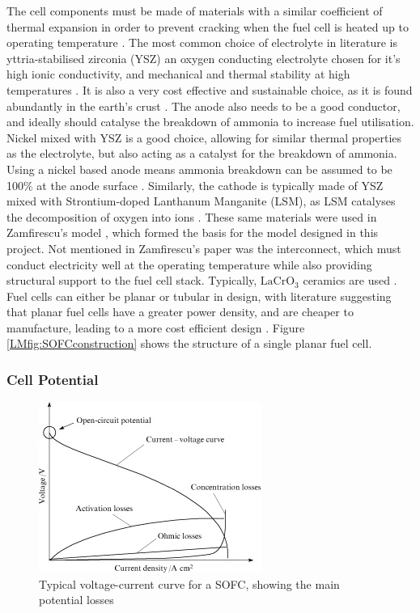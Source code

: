 \documentclass{article}
\begin{document}
    
    The cell components must be made of materials with a similar coefficient of thermal expansion in order to prevent cracking when the fuel cell is heated up to operating temperature \cite{LM2}. The most common choice of electrolyte in literature is yttria-stabilised zirconia (YSZ) \text{-} an oxygen conducting electrolyte \text{-} chosen for it's high ionic conductivity, and mechanical and thermal stability at high temperatures \cite{PR7}. It is also a very cost effective and sustainable choice, as it is found abundantly in the earth's crust \cite{LM10}. The anode also needs to be a good conductor, and ideally should catalyse the breakdown of ammonia to increase fuel utilisation. Nickel mixed with YSZ is a good choice, allowing for similar thermal properties as the electrolyte, but also acting as a catalyst for the breakdown of ammonia. Using a nickel based anode means ammonia breakdown can be assumed to be 100\% at the anode surface \cite{LM2}. Similarly, the cathode is typically made of YSZ mixed with Strontium-doped Lanthanum Manganite (LSM), as LSM catalyses the decomposition of oxygen into ions \cite{PR7}. These same materials were used in Zamfirescu's model \cite{LM5}, which formed the basis for the model designed in this project. Not mentioned in Zamfirescu's paper was the interconnect, which must conduct electricity well at the operating temperature while also providing structural support to the fuel cell stack.  Typically, $\text{LaCrO}_{3}$ ceramics are used \cite{LM10}. Fuel cells can either be planar or tubular in design, with literature suggesting that planar fuel cells have a greater power density, and are cheaper to manufacture, leading to a more cost efficient design \cite{LM2}. Figure \ref{LMfig:SOFCconstruction} shows the structure of a single planar fuel cell.
    
    
    \subsubsection{Cell Potential}
    
\begin{figure}[h]
    \centering
    \includegraphics{voltagecurve.jpg}
    \caption{Typical voltage-current curve for a SOFC, showing the main potential losses \cite{LM9}}
    \label{LMfig:SOFCvoltagecurve}
\end{figure}
    
\end{document}
